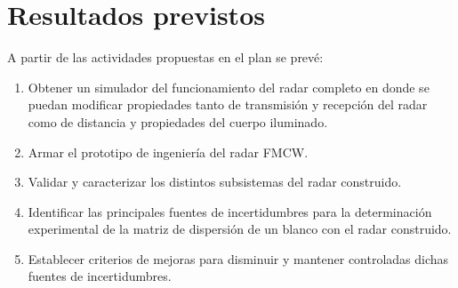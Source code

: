\chapter{Resultados previstos} \label{ch:results}

A partir de las actividades propuestas en el plan se prevé:

\begin{enumerate}
    \item Obtener un simulador del funcionamiento del radar completo en donde se puedan modificar propiedades tanto de transmisión y recepción del radar como de distancia y propiedades del cuerpo iluminado.

    \item Armar el prototipo de ingeniería del radar FMCW.

    \item Validar y caracterizar los distintos subsistemas del radar construido.

    \item Identificar las principales fuentes de incertidumbres para la determinación experimental de la matriz de dispersión de un blanco con el radar construido.

    \item Establecer criterios de mejoras para disminuir y mantener controladas dichas fuentes de incertidumbres.
\end{enumerate}

